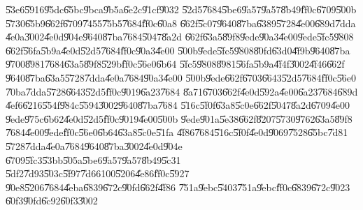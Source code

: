 \documentclass{article}
\begin{document}
\U{53e6}\U{5916}\U{95dc}\U{65bc}\U{9bca}\U{9b5a}\U{6e2c}\U{91cf}\U{9032}%
\U{52d5}\U{7684}\U{5be6}\U{9a57}\U{9a57}\U{8b49}\U{ff0c}\U{6709}\U{500b}%
\U{5730}\U{65b9}\U{662f}\U{6709}\U{7455}\U{75b5}\U{7684}\U{ff0c}\U{60a8}%
\U{662f}\U{5c07}\U{9640}\U{87ba}\U{6389}\U{5728}\U{4e00}\U{689d}\U{7dda}%
\U{4e0a}\U{3002}\U{4e0d}\U{904e}\U{9640}\U{87ba}\U{7684}\U{5047}\U{8a2d}%
\U{662f}\U{63a5}\U{89f8}\U{9ede}\U{90a3}\U{4e00}\U{9ede}\U{5fc5}\U{9808}%
\U{662f}\U{56fa}\U{5b9a}\U{4e0d}\U{52d5}\U{7684}\U{ff0c}\U{90a3}\U{4e00}%
\U{500b}\U{9ede}\U{5fc5}\U{9808}\U{80fd}\U{63d0}\U{4f9b}\U{9640}\U{87ba}%
\U{9700}\U{8981}\U{7684}\U{63a5}\U{89f8}\U{529b}\U{ff0c}\U{56e0}\U{6b64}%
\U{5fc5}\U{9808}\U{8981}\U{56fa}\U{5b9a}\U{4f4f}\U{3002}\U{4f46}\U{662f}%
\U{9640}\U{87ba}\U{63a5}\U{5728}\U{7dda}\U{4e0a}\U{7684}\U{90a3}\U{4e00}%
\U{500b}\U{9ede}\U{662f}\U{6703}\U{6643}\U{52d5}\U{7684}\U{ff0c}\U{56e0}%
\U{70ba}\U{7dda}\U{5728}\U{6643}\U{52d5}\U{ff0c}\U{9019}\U{6a23}\U{7684}%
\U{8a71}\U{6703}\U{662f}\U{4e0d}\U{592a}\U{4e00}\U{6a23}\U{7684}\U{689d}%
\U{4ef6}\U{6216}\U{554f}\U{984c}\U{5594}\U{3002}\U{9640}\U{87ba}\U{7684}%
\U{516c}\U{5f0f}\U{63a8}\U{5c0e}\U{662f}\U{5047}\U{8a2d}\U{6709}\U{4e00}%
\U{9ede}\U{975c}\U{6b62}\U{4e0d}\U{52d5}\U{ff0c}\U{9019}\U{4e00}\U{500b}%
\U{9ede}\U{901a}\U{5e38}\U{662f}\U{8207}\U{5730}\U{9762}\U{63a5}\U{89f8}%
\U{7684}\U{4e00}\U{9ede}\U{ff0c}\U{56e0}\U{6b64}\U{63a8}\U{5c0e}\U{51fa}%
\U{4f86}\U{7684}\U{516c}\U{5f0f}\U{4e0d}\U{9069}\U{7528}\U{65bc}\U{7d81}%
\U{5728}\U{7dda}\U{4e0a}\U{7684}\U{9640}\U{87ba}\U{3002}\U{4e0d}\U{904e}%
\U{6709}\U{5fc3}\U{53bb}\U{505a}\U{5be6}\U{9a57}\U{9a57}\U{8b49}\U{5c31}%
\U{5df2}\U{7d93}\U{503c}\U{5f97}\U{7d66}100\U{5206}\U{4e86}\U{ff0c}\U{5927}%
\U{90e8}\U{5206}\U{7684}\U{4eba}\U{6839}\U{672c}\U{90fd}\U{662f}\U{4f86}%
\U{751a}\U{9ebc}\U{5403}\U{751a}\U{9ebc}\U{ff0c}\U{6839}\U{672c}\U{9023}%
\U{60f3}\U{90fd}\U{6c92}\U{60f3}\U{3002}
\end{document}
